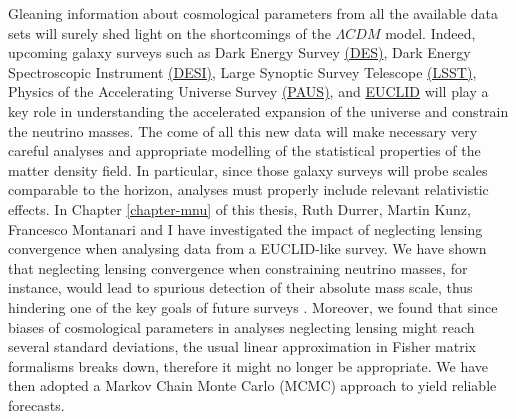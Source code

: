 Gleaning information about cosmological parameters from all the available data sets will surely shed light on the shortcomings of the $\Lambda CDM$ model. Indeed, upcoming galaxy surveys such as Dark Energy Survey \href{www.darkenergysurvey.org}{(DES)}, Dark Energy Spectroscopic Instrument \href{http://desi.lbl.gov/}{(DESI)}, Large Synoptic Survey Telescope \href{www.lsst.org}{(LSST)}, Physics of the Accelerating Universe Survey \href{www.pausurvey.org}{(PAUS)}, and \href{www.euclid-ec.org}{EUCLID} will play a key role in understanding the accelerated expansion of the universe and constrain the neutrino masses. The come of all this new data will make necessary very careful analyses and appropriate modelling of the statistical properties of the matter density field. In particular, since those galaxy surveys will probe scales comparable to the horizon, analyses must properly include relevant relativistic effects. In Chapter \ref{chapter-mnu} of this thesis, Ruth Durrer, Martin Kunz, Francesco Montanari and I have investigated the impact of neglecting lensing convergence when analysing data from a EUCLID-like survey. We have shown that neglecting lensing convergence when constraining neutrino masses, for instance, would lead to spurious detection of their absolute mass scale, thus hindering one of the key goals of future surveys \cite{Cardona:2016qxn}. Moreover, we found that since biases of cosmological parameters in analyses neglecting lensing might reach several standard deviations, the usual linear approximation in Fisher matrix formalisms breaks down,  therefore it might no longer be appropriate. We have then adopted a Markov Chain Monte Carlo (MCMC) approach to yield reliable forecasts.

